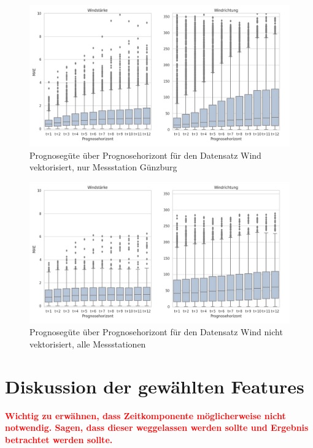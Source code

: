 \documentclass[
12pt, %
toc=listofnumbered, %
toc=chapterentrydotfill, %
numbers=noenddot, %
captions=tableheading, %
bibliography=numbered
]{scrreprt}
\let\Oldsection\section
\renewcommand{\section}{\FloatBarrier\Oldsection}
\newcommand{\qm}[1]{\glqq#1\grqq{}} %
\newcommand{\highlight}[1]{\textbf{\textcolor{red}{#1}}}
\begin{document}
\begin{figure}[tph]
	\begin{center}
		\includegraphics[width=\linewidth]{./images/Güte über Prognosehorizont sd single-cropped.jpg}
		\caption{Prognosegüte über Prognosehorizont für den Datensatz \qm{Wind vektorisiert, nur Messstation Günzburg}}
		\label{fig:güte_über_zeit_xy_single}
	\end{center}
\end{figure}

\begin{figure}[tph]
	\begin{center}
		\includegraphics[width=\linewidth]{./images/Güte über Prognosehorizont sd direkt-cropped.jpg}
		\caption{Prognosegüte über Prognosehorizont für den Datensatz \qm{Wind nicht vektorisiert, alle Messstationen}}
		\label{fig:güte_über_zeit_sd_all}
	\end{center}
\end{figure}

\section{Diskussion der gewählten Features}
\highlight{Wichtig zu erwähnen, dass Zeitkomponente möglicherweise nicht notwendig. Sagen, dass dieser weggelassen werden sollte und Ergebnis betrachtet werden sollte.}
\end{document}

